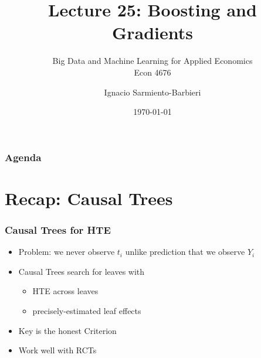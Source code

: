 \documentclass[
  shownotes,
  xcolor={svgnames},
  hyperref={colorlinks,citecolor=DarkBlue,linkcolor=DarkRed,urlcolor=DarkBlue}
  , aspectratio=169]{beamer}
\begin{document}
 
\title[Lecture 25]{Lecture 25:  Boosting and Gradients}
\subtitle{Big Data and Machine Learning for Applied Economics \\ Econ 4676}
\date{\today}

\author[Sarmiento-Barbieri]{Ignacio Sarmiento-Barbieri}


\begin{frame}[noframenumbering]
\maketitle
\end{frame}






\begin{frame}
\frametitle{Agenda}

\tableofcontents

\end{frame}
\section{Recap: Causal Trees}
\begin{frame}[fragile]
\frametitle{Causal Trees for HTE}

\begin{itemize}
  \item Problem: we never observe $t_i$ unlike prediction that we observe $Y_i$
    \medskip
    \item Causal Trees search for leaves with
    \begin{itemize}
      \item HTE across leaves
      \medskip
      \item precisely-estimated leaf effects
    \end{itemize}
    \item Key is the honest Criterion
    \medskip
    \item Work well with RCTs
\end{itemize}


\end{frame}
\end{document}
